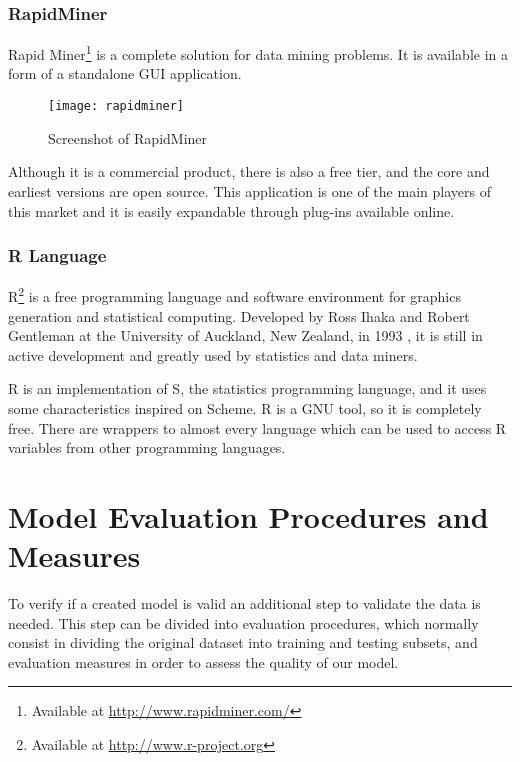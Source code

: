 \subsubsection{RapidMiner}

Rapid Miner\footnote{ Available at \url{http://www.rapidminer.com/}} is a complete solution for data mining problems. It is available in a form of
a standalone GUI application.
\begin{figure}[h]
  \begin{center}
    \leavevmode
    \texttt{[image: rapidminer]}
    \caption{Screenshot of RapidMiner \protect\footnotemark}
    \label{fig:RapidMiner}
  \end{center}
\end{figure}
 Although it is a commercial product, there is also a free tier, and the core and earliest versions are open source. This application
is one of the main players of this market and it is easily expandable through plug-ins available online.

\subsubsection{R Language}
R\footnote{ Available at \url{http://www.r-project.org}} is a free programming language and software environment for graphics generation and statistical computing.
Developed by Ross Ihaka and Robert Gentleman at the University of Auckland, New Zealand, in 1993 \cite{Ihaka98r:past}, it is still in active development and
greatly used by statistics and data miners.

R is an implementation of S, the statistics programming language, and it uses some characteristics inspired on Scheme.
R is a GNU tool, so it is completely free. There are wrappers to almost every language which can be used to access R variables from other programming languages.

\section{Model Evaluation Procedures and Measures}

To verify if a created model is valid an additional step to validate the data is
needed. This step can be divided into evaluation procedures, which normally
consist in dividing the original dataset into training and testing subsets, and
evaluation measures in order to assess the quality of our model.

